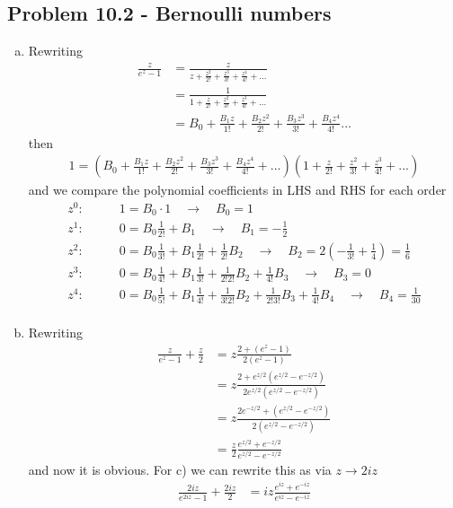 \documentclass[../main.tex]{subfiles}
\begin{document}
\subsection{Problem 10.2 - Bernoulli numbers}
\begin{enumerate}[a)]
\item Rewriting
\begin{align}
\frac{z}{e^z-1}
&=\frac{z}{z+\frac{z^2}{2!}+\frac{z^3}{3!}+\frac{z^4}{4!}+...}\\
&=\frac{1}{1+\frac{z}{2!}+\frac{z^2}{3!}+\frac{z^3}{4!}+...}\\
&=B_0+\frac{B_1z}{1!}+\frac{B_2z^2}{2!}+\frac{B_3z^3}{3!}+\frac{B_4z^4}{4!}...
\end{align}
then
\begin{align}
1=\left(B_0+\frac{B_1z}{1!}+\frac{B_2z^2}{2!}+\frac{B_3z^3}{3!}+\frac{B_4z^4}{4!}+...\right)\left(1+\frac{z}{2!}+\frac{z^2}{3!}+\frac{z^3}{4!}+...\right)
\end{align}
and we compare the polynomial coefficients in LHS and RHS for each order
\begin{align}
z^0:&\qquad 1=B_0\cdot1\quad\rightarrow\quad B_0=1\\
z^1:&\qquad 0=B_0\frac{1}{2!}+B_1\quad\rightarrow\quad B_1=-\frac{1}{2}\\
z^2:&\qquad 0=B_0\frac{1}{3!}+B_1\frac{1}{2!}+\frac{1}{2!}B_2\quad\rightarrow\quad B_2=2\left(-\frac{1}{3!}+\frac{1}{4}\right)=\frac{1}{6}\\
z^3:&\qquad 0=B_0\frac{1}{4!}+B_1\frac{1}{3!}+\frac{1}{2!2!}B_2+\frac{1}{4!}B_3\quad\rightarrow\quad B_3=0\\
z^4:&\qquad 0=B_0\frac{1}{5!}+B_1\frac{1}{4!}+\frac{1}{3!2!}B_2+\frac{1}{2!3!}B_3+\frac{1}{4!}B_4\quad\rightarrow\quad B_4=\frac{1}{30}\\
\end{align}
\item Rewriting
\begin{align}
\frac{z}{e^z-1}+\frac{z}{2}
&=z\frac{2+(e^z-1)}{2(e^z-1)}\\
&=z\frac{2+e^{z/2}(e^{z/2}-e^{-z/2})}{2e^{z/2}(e^{z/2}-e^{-z/2})}\\
&=z\frac{2e^{-z/2}+(e^{z/2}-e^{-z/2})}{2(e^{z/2}-e^{-z/2})}\\
&=\frac{z}{2}\frac{e^{z/2}+e^{-z/2}}{e^{z/2}-e^{-z/2}}
\end{align}
and now it is obvious. For c) we can rewrite this as via $z\rightarrow2iz$
\begin{align}
\frac{2iz}{e^{2iz}-1}+\frac{2iz}{2}&=iz\frac{e^{iz}+e^{-iz}}{e^{iz}-e^{-iz}}
\end{align} 
  

\end{enumerate}
\end{document}
